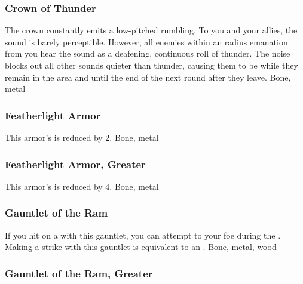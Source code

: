 \hypertarget{item:Crown of Thunder}{\subsubsection{Crown of Thunder\hfill{}}}
The crown constantly emits a low-pitched rumbling.
To you and your allies, the sound is barely perceptible.
However, all enemies within an \arealarge radius emanation from you hear the sound as a deafening, continuous roll of thunder.
The noise blocks out all other sounds quieter than thunder, causing them to be \deafened while they remain in the area and until the end of the next round after they leave.
 
 Bone, metal
\lowercase{\hypertarget{item:Featherlight Armor}{}}\label{item:Featherlight Armor}
\hypertarget{item:Featherlight Armor}{\subsubsection{Featherlight Armor\hfill{}}}
This armor's  is reduced by 2.
 
 Bone, metal
\lowercase{\hypertarget{item:Featherlight Armor, Greater}{}}\label{item:Featherlight Armor, Greater}
\hypertarget{item:Featherlight Armor, Greater}{\subsubsection{Featherlight Armor, Greater\hfill{}}}
This armor's  is reduced by 4.
 
 Bone, metal
\lowercase{\hypertarget{item:Gauntlet of the Ram}{}}\label{item:Gauntlet of the Ram}
\hypertarget{item:Gauntlet of the Ram}{\subsubsection{Gauntlet of the Ram\hfill{}}}
If you hit on a  with this gauntlet, you can attempt to  your foe during the .
Making a strike with this gauntlet is equivalent to an .
 
 Bone, metal, wood
\lowercase{\hypertarget{item:Gauntlet of the Ram, Greater}{}}\label{item:Gauntlet of the Ram, Greater}
\hypertarget{item:Gauntlet of the Ram, Greater}{\subsubsection{Gauntlet of the Ram, Greater\hfill{}}}
